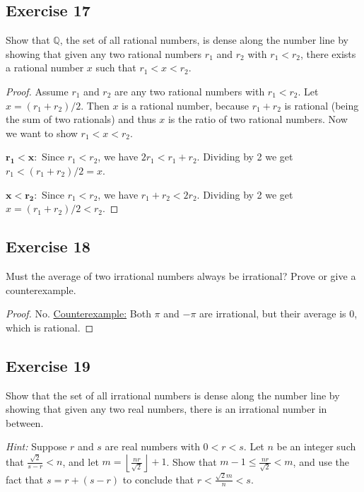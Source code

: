 \documentclass[14pt]{extarticle}
\newcommand{\dps}{\displaystyle}
\newcommand{\Q}{\mathbb{Q}}
\newcommand{\floor}[1]{{\left\lfloor#1\right\rfloor}}
\begin{document}
\subsection{Exercise 17}
Show that $\Q$, the set of all rational numbers, is dense along the number line by showing that given any two 
rational numbers $r_1$ and $r_2$ with \(r_1 < r_2\), there exists a rational number $x$ such that \(r_1 < x < r_2\).

\begin{proof}
Assume $r_1$ and $r_2$ are any two rational numbers with \(r_1 < r_2\). Let \(x = (r_1 + r_2) / 2\). Then $x$ is a
rational number, because $r_1 + r_2$ is rational (being the sum of two rationals) and thus $x$ is the ratio of two
rational numbers. Now we want to show \(r_1 < x < r_2\).

\(\bm{r_1 < x}:\) Since \(r_1 < r_2\), we have \(2r_1 < r_1 + r_2\). Dividing by 2 we get \(r_1 < (r_1 + r_2)/2 = x\).

\(\bm{x < r_2}:\) Since \(r_1 < r_2\), we have \(r_1 + r_2 < 2r_2\). Dividing by 2 we get \(x = (r_1 + r_2)/2 < r_2\).
\end{proof}

\subsection{Exercise 18}
Must the average of two irrational numbers always be irrational? Prove or give a counterexample.

\begin{proof}
No. \underline{Counterexample:} Both \(\pi\) and \(-\pi\) are irrational, but their average is 0, which is rational.
\end{proof}

\subsection{Exercise 19}
Show that the set of all irrational numbers is dense along the number line by showing that given any two real numbers, there is an irrational number in between.

{\it Hint:} Suppose $r$ and $s$ are real numbers with \(0 < r < s\). Let $n$ be an integer such that \(\dps \frac 
{\sqrt{2}}{s-r} < n\), and let \(\dps m = \floor {\frac{nr}{\sqrt{2}}} + 1\). Show that \(\dps m-1 \leq \frac{nr}
{\sqrt{2}} < m\), and use the fact that \(s = r + (s-r)\) to conclude that \(\dps r < \frac{\sqrt{2}m}{n} < s\).
\end{document}
